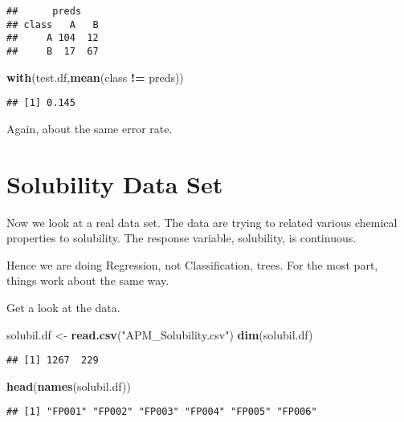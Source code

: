 \documentclass[]{article}
\newenvironment{Shaded}{\begin{snugshade}}{\end{snugshade}}
\newcommand{\KeywordTok}[1]{\textcolor[rgb]{0.13,0.29,0.53}{\textbf{#1}}}
\newcommand{\NormalTok}[1]{#1}
\newcommand{\OperatorTok}[1]{\textcolor[rgb]{0.81,0.36,0.00}{\textbf{#1}}}
\newcommand{\StringTok}[1]{\textcolor[rgb]{0.31,0.60,0.02}{#1}}
\begin{document}
\begin{verbatim}
##      preds
## class   A   B
##     A 104  12
##     B  17  67
\end{verbatim}

\begin{Shaded}
\begin{Highlighting}[]
\KeywordTok{with}\NormalTok{(test.df,}\KeywordTok{mean}\NormalTok{(class }\OperatorTok{!=}\StringTok{ }\NormalTok{preds))}
\end{Highlighting}
\end{Shaded}

\begin{verbatim}
## [1] 0.145
\end{verbatim}

Again, about the same error rate.

\hypertarget{solubility-data-set}{%
\section{Solubility Data Set}\label{solubility-data-set}}

Now we look at a real data set. The data are trying to related various
chemical properties to solubility. The response variable, solubility, is
continuous.

Hence we are doing Regression, not Classification, trees. For the most
part, things work about the same way.

Get a look at the data.

\begin{Shaded}
\begin{Highlighting}[]
\NormalTok{solubil.df <-}\StringTok{ }\KeywordTok{read.csv}\NormalTok{(}\StringTok{"APM_Solubility.csv"}\NormalTok{)}
\KeywordTok{dim}\NormalTok{(solubil.df)}
\end{Highlighting}
\end{Shaded}

\begin{verbatim}
## [1] 1267  229
\end{verbatim}

\begin{Shaded}
\begin{Highlighting}[]
\KeywordTok{head}\NormalTok{(}\KeywordTok{names}\NormalTok{(solubil.df))}
\end{Highlighting}
\end{Shaded}

\begin{verbatim}
## [1] "FP001" "FP002" "FP003" "FP004" "FP005" "FP006"
\end{verbatim}
\end{document}
